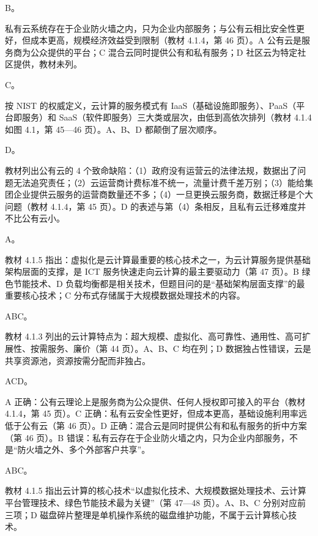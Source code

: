 \documentclass[a4paper,11pt]{article}
\begin{document}
\q B。\begin{analysis}私有云系统存在于企业防火墙之内，只为企业内部服务；与公有云相比安全性更好，但成本更高，规模经济效益受到限制（教材 4.1.4，第 46 页）。A 公有云是服务商为公众提供的平台；C 混合云同时提供公有和私有服务；D 社区云为特定社区提供，教材未列。\end{analysis}

\q C。\begin{analysis}按 NIST 的权威定义，云计算的服务模式有 IaaS（基础设施即服务）、PaaS（平台即服务）和 SaaS（软件即服务）三大类或层次，由低到高依次排列（教材 4.1.4 如图 4.1，第 45—46 页）。A、B、D 都颠倒了层次顺序。\end{analysis}

\q D。\begin{analysis}教材列出公有云的 4 个致命缺陷：（1）政府没有运营云的法律法规，数据出了问题无法追究责任；（2）云运营商计费标准不统一，流量计费千差万别；（3）能给集团企业提供云服务的运营商数量还不多；（4）一旦更换云服务商，数据迁移是个大问题（教材 4.1.4，第 45 页）。D 的表述与第（4）条相反，且私有云迁移难度并不比公有云小。\end{analysis}

\q A。\begin{analysis}教材 4.1.5 指出：虚拟化是云计算最重要的核心技术之一，为云计算服务提供基础架构层面的支撑，是 ICT 服务快速走向云计算的最主要驱动力（第 47 页）。B 绿色节能技术、D 负载均衡都是相关技术，但题目问的是“基础架构层面支撑”的最重要核心技术；C 分布式存储属于大规模数据处理技术的内容。\end{analysis}


\q ABC。\begin{analysis}教材 4.1.3 列出的云计算特点为：超大规模、虚拟化、高可靠性、通用性、高可扩展性、按需服务、廉价（第 44 页）。A、B、C 均在列；D 数据独占性错误，云是共享资源池，资源按需分配而非独占。\end{analysis}

\q ACD。\begin{analysis}A 正确：公有云理论上是服务商为公众提供、任何人授权即可接入的平台（教材 4.1.4，第 45 页）。C 正确：私有云安全性更好，但成本更高，基础设施利用率远低于公有云（第 46 页）。D 正确：混合云是同时提供公有和私有服务的折中方案（第 46 页）。B 错误：私有云存在于企业防火墙之内，只为企业内部服务，不是“防火墙之外、多个外部客户共享”。\end{analysis}

\q ABC。\begin{analysis}教材 4.1.5 指出云计算的核心技术“以虚拟化技术、大规模数据处理技术、云计算平台管理技术、绿色节能技术最为关键”（第 47—48 页）。A、B、C 分别对应前三项；D 磁盘碎片整理是单机操作系统的磁盘维护功能，不属于云计算核心技术。\end{analysis}
\end{document}

